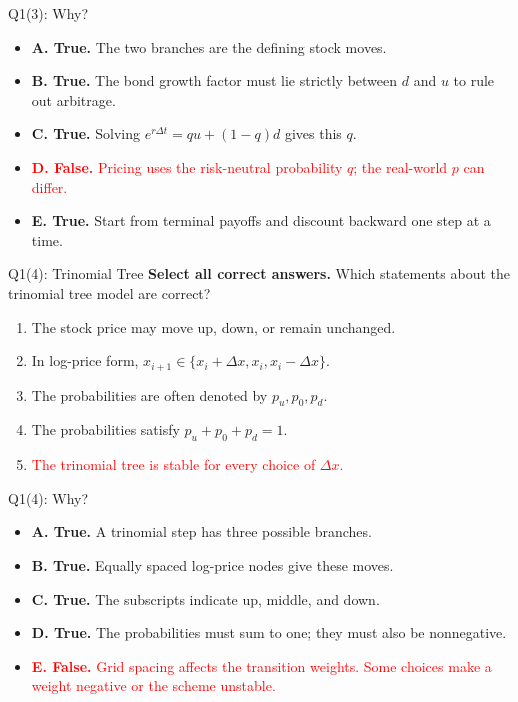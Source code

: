 \documentclass{beamer}
\newcommand{\wrong}[1]{\textcolor{red}{#1}}
\begin{document}
\begin{frame}{Q1(3): Why?}
\small
\begin{itemize}
\item \textbf{A. True.} The two branches are the defining stock moves.
\item \textbf{B. True.} The bond growth factor must lie strictly
between $d$ and $u$ to rule out arbitrage.
\item \textbf{C. True.} Solving
$e^{r\Delta t}=qu+(1-q)d$ gives this $q$.
\item \wrong{\textbf{D. False.} Pricing uses the risk-neutral
probability $q$; the real-world $p$ can differ.}
\item \textbf{E. True.} Start from terminal payoffs and discount
backward one step at a time.
\end{itemize}
\end{frame}

\begin{frame}{Q1(4): Trinomial Tree}
\small
\textbf{Select all correct answers.} Which statements about the
trinomial tree model are correct?
\begin{enumerate}
\item[A.] The stock price may move up, down, or remain unchanged.
\item[B.] In log-price form,
$x_{i+1}\in\{x_i+\Delta x,x_i,x_i-\Delta x\}$.
\item[C.] The probabilities are often denoted by $p_u,p_0,p_d$.
\item[D.] The probabilities satisfy $p_u+p_0+p_d=1$.
\item[\wrong{E.}] \wrong{The trinomial tree is stable for every choice
of $\Delta x$.}
\end{enumerate}
\end{frame}

\begin{frame}{Q1(4): Why?}
\small
\begin{itemize}
\item \textbf{A. True.} A trinomial step has three possible branches.
\item \textbf{B. True.} Equally spaced log-price nodes give these moves.
\item \textbf{C. True.} The subscripts indicate up, middle, and down.
\item \textbf{D. True.} The probabilities must sum to one; they must
also be nonnegative.
\item \wrong{\textbf{E. False.} Grid spacing affects the transition
weights. Some choices make a weight negative or the scheme unstable.}
\end{itemize}
\end{frame}
\end{document}
